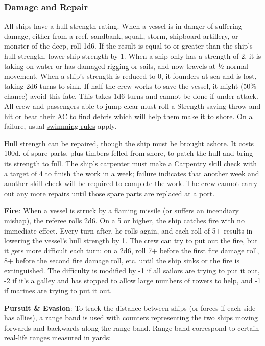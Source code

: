 \documentclass{book}
\begin{document}
\subsubsection*{Damage and Repair}\label{damage-and-repair}

All ships have a hull strength rating. When a vessel is in danger of
suffering damage, either from a reef, sandbank, squall, storm, shipboard
artillery, or monster of the deep, roll 1d6. If the result is equal to
or greater than the ship's hull strength, lower ship strength by 1. When
a ship only has a strength of 2, it is taking on water or has damaged
rigging or sails, and now travels at ½ normal movement. When a ship's
strength is reduced to 0, it founders at sea and is lost, taking 2d6
turns to sink. If half the crew works to save the vessel, it might (50\%
chance) avoid this fate. This takes 1d6 turns and cannot be done if
under attack. All crew and passengers able to jump clear must roll a
Strength saving throw and hit or beat their AC to find debris which will
help them make it to shore. On a failure, usual
\hyperref[swimming]{swimming rules} apply.

Hull strength can be repaired, though the ship must be brought ashore.
It costs 100d. of spare parts, plus timbers felled from shore, to patch
the hull and bring its strength to full. The ship's carpenter must make
a Carpentry skill check with a target of 4 to finish the work in a week;
failure indicates that another week and another skill check will be
required to complete the work. The crew cannot carry out any more
repairs until those spare parts are replaced at a port.

\textbf{Fire}: When a vessel is struck by a flaming missile (or suffers
an incendiary mishap), the referee rolls 2d6. On a 5 or higher, the ship
catches fire with no immediate effect. Every turn after, he rolls again,
and each roll of 5+ results in lowering the vessel's hull strength by 1.
The crew can try to put out the fire, but it gets more difficult each
turn: on a 2d6, roll 7+ before the first fire damage roll, 8+ before the
second fire damage roll, etc. until the ship sinks or the fire is
extinguished. The difficulty is modified by -1 if all sailors are trying
to put it out, -2 if it's a galley and has stopped to allow large
numbers of rowers to help, and -1 if marines are trying to put it out.

\textbf{Pursuit \& Evasion}: To track the distance between ships (or
forces if each side has allies), a range band is used with counters
representing the two ships moving forwards and backwards along the range
band. Range band correspond to certain real-life ranges measured in
yards:
\end{document}
